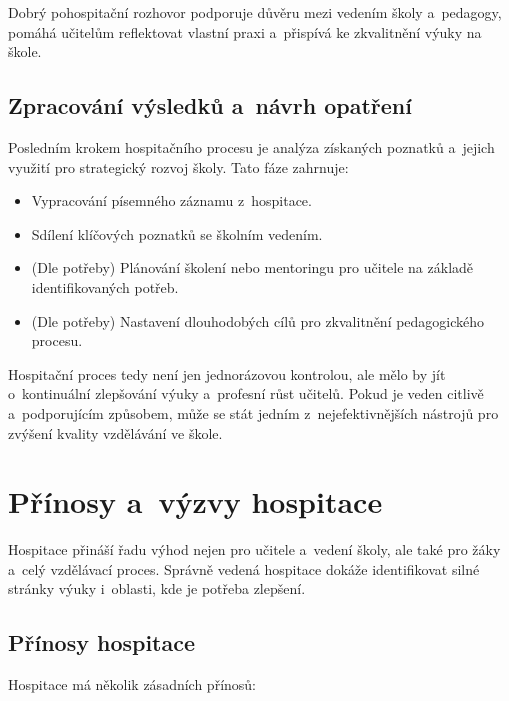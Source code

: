 Dobrý pohospitační rozhovor podporuje důvěru mezi vedením školy a~pedagogy, pomáhá učitelům reflektovat vlastní praxi a~přispívá ke zkvalitnění výuky na škole.

\subsection{Zpracování výsledků a~návrh opatření}

Posledním krokem hospitačního procesu je analýza získaných poznatků a~jejich využití pro strategický rozvoj školy. Tato fáze zahrnuje:

\begin{itemize}
    \item Vypracování písemného záznamu z~hospitace.
    \item Sdílení klíčových poznatků se školním vedením.
    \item (Dle potřeby) Plánování školení nebo mentoringu pro učitele na základě identifikovaných potřeb.
    \item (Dle potřeby) Nastavení dlouhodobých cílů pro zkvalitnění pedagogického procesu.
\end{itemize}

Hospitační proces tedy není jen jednorázovou kontrolou, ale mělo by jít o~kontinuální zlepšování výuky a~profesní růst učitelů. Pokud je veden citlivě a~podporujícím způsobem, může se stát jedním z~nejefektivnějších nástrojů pro zvýšení kvality vzdělávání ve škole.

\section{Přínosy a~výzvy hospitace}

Hospitace přináší řadu výhod nejen pro učitele a~vedení školy, ale také pro žáky a~celý vzdělávací proces. Správně vedená hospitace dokáže identifikovat silné stránky výuky i~oblasti, kde je potřeba zlepšení.


\subsection{Přínosy hospitace}

Hospitace má několik zásadních přínosů:

